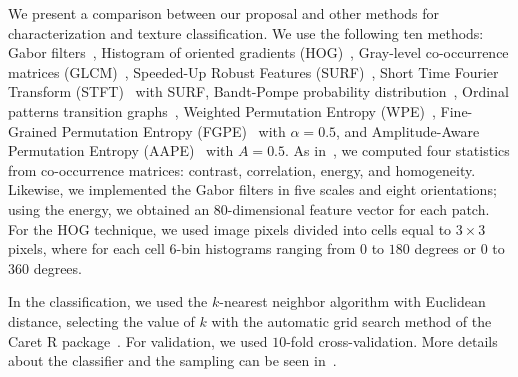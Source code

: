 \documentclass[journal]{IEEEtran}
\begin{document}
	We present a comparison between our proposal and other methods for characterization and texture classification.
    We use the following ten methods: 
	Gabor filters~\cite{weldon1996efficient},  
    Histogram of oriented gradients (HOG)~\cite{dalal2005histograms},
	Gray-level co-occurrence matrices (GLCM)~\cite{kourgli2012texture}, 
    Speeded-Up Robust Features (SURF)~\cite{bay2006surf},
    Short Time Fourier Transform (STFT)~\cite{portnoff1980time} with SURF,
	Bandt-Pompe probability distribution~\cite{Bandt2002Permutation}, 
	Ordinal patterns transition graphs~\cite{Borges2019Transition},
	Weighted Permutation Entropy (WPE)~\cite{Fadlallah2013Weightedpermutation},
	Fine-Grained Permutation Entropy (FGPE)~\cite{xiao2009fine} with $\alpha = 0.5$, and
	Amplitude-Aware Permutation Entropy (AAPE)~\cite{azami2016amplitude} with $A = 0.5$.
	As in~\cite{guan2019covariance}, 
    we computed four statistics from co-occurrence matrices: contrast, correlation, energy, and homogeneity.
    Likewise, we implemented the Gabor filters in five scales and eight orientations; using the energy, we obtained an $80$-dimensional feature vector for each patch.
    For the HOG technique, we used image pixels divided into cells equal to $3 \times 3$ pixels, where for each cell 6-bin histograms ranging from $0$ to $180$ degrees or $0$ to $360$ degrees.
	
	In the classification, we used the $k$-nearest neighbor algorithm with Euclidean distance, selecting the value of $k$ with the automatic grid search method of the Caret R package~\cite{kuhn2008building}.
	For validation, we used $10$-fold cross-validation.
	More details about the classifier and the sampling can be seen in~\cite{mitchell1997machine}.
	
\end{document}
